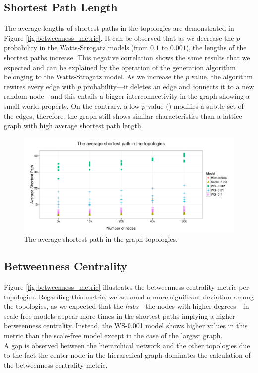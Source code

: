 \subsection{Shortest Path Length}

The average lengths of shortest paths in the topologies are demonstrated in Figure \ref{fig:betweenness_metric}. It can be observed that as we decrease the $p$ probability in the Watts-Strogatz models (from $0.1$ to $0.001$), the lengths of the shortest paths increase. This negative correlation shows the same results that we expected and can be explained by the operation of the generation algorithm belonging to the Watts-Strogatz model. As we increase the $p$ value, the algorithm rewires every edge with $p$ probability---\ie it deletes an edge and connects it to a new random node---and this entails a bigger interconnectivity in the graph showing a small-world property. On the contrary, a low $p$ value () modifies a subtle set of the edges, therefore, the graph still shows similar characteristics than a lattice graph with high average shortest path length.

\begin{figure}[!ht]
	\centering
	\includegraphics[width=160mm, keepaspectratio]{figures/avg_sp_metric.pdf}
	\caption{The average shortest path in the graph topologies.}
	\label{fig:avg_shortest_path}
\end{figure}

\subsection{Betweenness Centrality}

Figure \ref{fig:betweenness_metric} illustrates the betweenness centrality metric per topologies. Regarding this metric, we assumed a more significant deviation among the topologies, as we expected that the \emph{hubs}---the nodes with higher degrees---in scale-free models appear more times in the shortest paths implying a higher betweenness centrality. Instead, the WS-0.001 model shows higher values in this metric than the scale-free model except in the case of the largest graph.\\
A gap is observed between the hierarchical network and the other topologies due to the fact the center node in the hierarchical graph dominates the calculation of the betweenness centrality metric.

